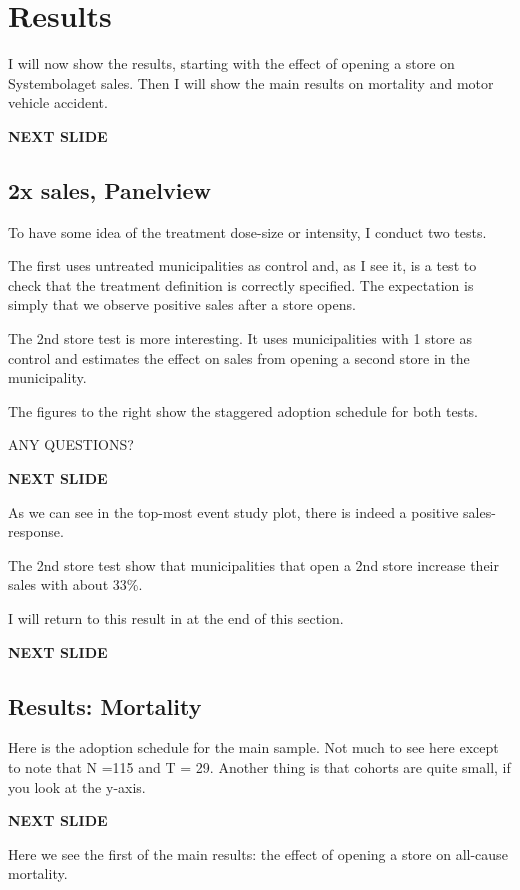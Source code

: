 \documentclass[12pt]{article}
\begin{document}
\section{Results}

I will now show the results, starting with the effect of opening a store on Systembolaget sales. Then I will show the main results on mortality and motor vehicle accident.

\textbf{NEXT SLIDE}

\subsection{2x sales, Panelview}
To have some idea of the treatment dose-size or intensity, I conduct two tests.

The first uses untreated municipalities as control and, as I see it, is a test to check that the treatment definition is correctly specified. The expectation is simply that we observe positive sales after a store opens.

The 2nd store test is more interesting. It uses municipalities with 1 store as control and estimates the effect on sales from opening a second store in the municipality.

The figures to the right show the staggered adoption schedule for both tests. 

ANY QUESTIONS?

\textbf{NEXT SLIDE}

As we can see in the top-most event study plot, there is indeed a positive sales-response.

The 2nd store test show that municipalities that open a 2nd store increase their sales with about 33\%. 

I will return to this result in at the end of this section.

\textbf{NEXT SLIDE}

\subsection{Results: Mortality} 

Here is the adoption schedule for the main sample. Not much to see here except to note that N =115 and T = 29. Another thing is that cohorts are quite small, if you look at the y-axis.

\textbf{NEXT SLIDE}

Here we see the first of the main results: the effect of opening a store on all-cause mortality. 
\end{document}
